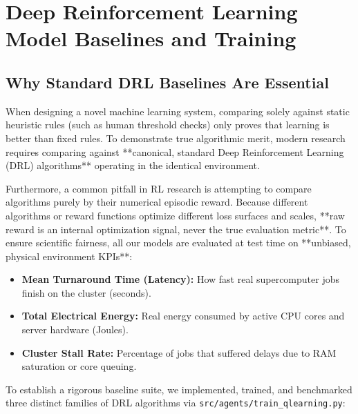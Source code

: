 \documentclass[11pt,a4paper]{article}
\begin{document}
\section{Deep Reinforcement Learning Model Baselines and Training}

\subsection{Why Standard DRL Baselines Are Essential}
When designing a novel machine learning system, comparing solely against static heuristic rules (such as human threshold checks) only proves that learning is better than fixed rules. To demonstrate true algorithmic merit, modern research requires comparing against **canonical, standard Deep Reinforcement Learning (DRL) algorithms** operating in the identical environment.

Furthermore, a common pitfall in RL research is attempting to compare algorithms purely by their numerical episodic reward. Because different algorithms or reward functions optimize different loss surfaces and scales, **raw reward is an internal optimization signal, never the true evaluation metric**. To ensure scientific fairness, all our models are evaluated at test time on **unbiased, physical environment KPIs**:
\begin{itemize}[noitemsep, topsep=1pt]
    \item \textbf{Mean Turnaround Time (Latency):} How fast real supercomputer jobs finish on the cluster (seconds).
    \item \textbf{Total Electrical Energy:} Real energy consumed by active CPU cores and server hardware (Joules).
    \item \textbf{Cluster Stall Rate:} Percentage of jobs that suffered delays due to RAM saturation or core queuing.
\end{itemize}

To establish a rigorous baseline suite, we implemented, trained, and benchmarked three distinct families of DRL algorithms via \texttt{src/agents/train\_qlearning.py}:
\end{document}
